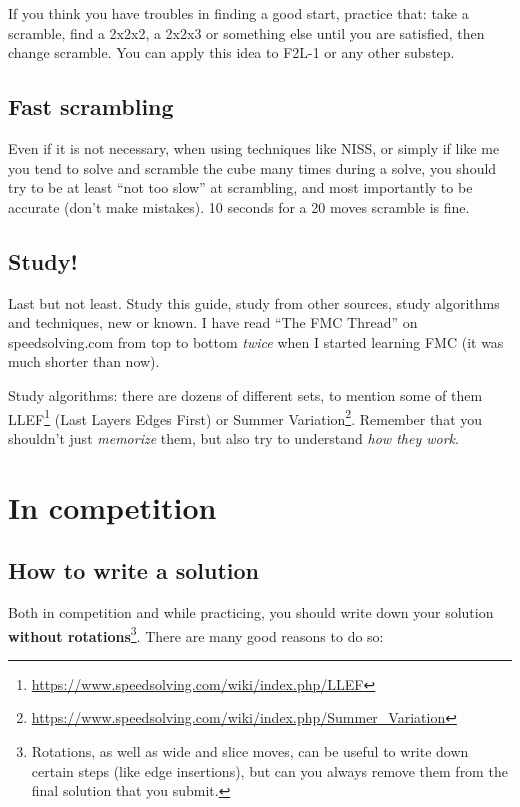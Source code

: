 \documentclass[11pt,a4paper]{book}
\begin{document}
If you think you have troubles in finding a good start, practice that: take a scramble, find a 2x2x2, a 2x2x3 or something else until you are satisfied, then change scramble. You can apply this idea to F2L-1 or any other substep.

\section{Fast scrambling}

Even if it is not necessary, when using techniques like NISS, or simply if like me you tend to solve and scramble the cube many times during a solve, you should try to be at least ``not too slow'' at scrambling, and most importantly to be accurate (don't make mistakes). 10 seconds for a 20 moves scramble is fine.

\section{Study!}

Last but not least. Study this guide, study from other sources, study algorithms and techniques, new or known. I have read ``The FMC Thread'' on speedsolving.com from top to bottom \emph{twice} when I started learning FMC (it was much shorter than now).

Study algorithms: there are dozens of different sets, to mention some of them LLEF\footnote{\url{https://www.speedsolving.com/wiki/index.php/LLEF}} (Last Layers Edges First) or Summer Variation\footnote{\url{https://www.speedsolving.com/wiki/index.php/Summer_Variation}}. Remember that you shouldn't just \emph{memorize} them, but also try to understand \emph{how they work}.

\chapter{In competition}

\section{How to write a solution}
\label{write_down}

Both in competition and while practicing, you should write down your solution \textbf{without rotations}\footnote{Rotations, as well as wide and slice moves, can be useful to write down certain steps (like edge insertions), but can you always remove them from the final solution that you submit.}. There are many good reasons to do so:
\end{document}
